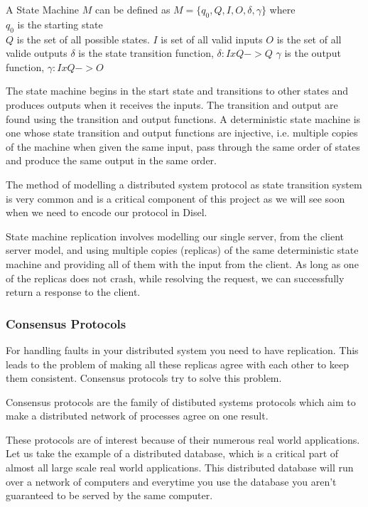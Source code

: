 A State Machine $M$ can be defined as $M = \lbrace q_0, Q, I, O, \delta, \gamma \rbrace$ where \\
$q_0$ is the starting state \\
$Q$ is the set of all possible states.
$I$ is set of all valid inputs
$O$ is the set of all valide outputs
$\delta$ is the state transition function, $\delta : I x Q -> Q$
$\gamma$ is the output function, $\gamma : I x Q -> O$

The state machine begins in the start state and transitions to other states and
produces outputs when it receives the inputs. The transition and output are found
using the transition and output functions. A deterministic state machine is one
whose state transition and output functions are injective, i.e. multiple
copies of the machine when given the same input, pass through the same order of states
and produce the same output in the same order.

The method of modelling a distributed system protocol as state transition system
is very common and is a critical component of this project as we will see soon when
we need to encode our protocol in Disel.

State machine replication involves modelling our single server, from the client
server model, and using multiple copies (replicas) of the same deterministic
state machine and providing all of them with the input from the client.
As long as one of the replicas does not crash, while resolving the request,
we can successfully return a response to the client.


\subsubsection{Consensus Protocols}
For handling faults in your distributed system you need to have replication.
This leads to the problem of making all these replicas agree with each other
to keep them consistent. Consensus protocols try to solve this problem.

Consensus protocols are the family of distibuted systems protocols which aim to
make a distributed network of processes agree on one result.

These protocols are of interest because of their numerous real world applications.
Let us take the example of a distributed database, which is a critical part of almost
all large scale real world applications. This distributed database will run
over a network of computers and everytime you use the database you aren't guaranteed
to be served by the same computer.

